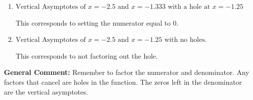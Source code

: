 \documentclass{extbook}[14pt]
\begin{document}
\begin{enumerate}
{\begin{enumerate}[label=\Alph*.]
This is the correct answer.
\item \( \text{Vertical Asymptotes of } x = -2.5 \text{ and } x = -1.333 \text{ with a hole at } x = -1.25 \)

This corresponds to setting the numerator equal to 0.
\item \( \text{Vertical Asymptotes of } x = -2.5 \text{ and } x = -1.25 \text{ with no holes.} \)

This corresponds to not factoring out the hole.
\end{enumerate}

\textbf{General Comment:} Remember to factor the numerator and denominator. Any factors that cancel are holes in the function. The zeros left in the denominator are the vertical asymptotes.
}
\end{enumerate}
\end{document}
